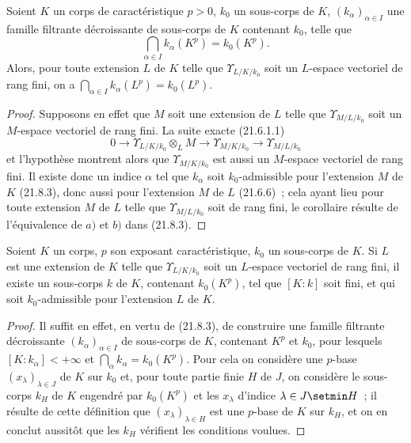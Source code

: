 \begin{corollary}[21.8.5]
\label{0.21.8.5-fr}
Soient $K$ un corps de caractéristique $p>0$, $k_0$ un sous-corps de $K$,
$(k_\alpha)_{\alpha\in I}$ une famille filtrante décroissante de sous-corps
de $K$ contenant $k_0$, telle que
\[
  \bigcap_{\alpha\in I}k_\alpha(K^p)=k_0(K^p).
\]
Alors, pour toute extension $L$ de $K$ telle que $\Upsilon_{L/K/k_0}$ soit
un $L$-espace vectoriel de rang fini, on a $\bigcap_{\alpha\in I}k_\alpha(L^p)=k_0(L^p)$.
\end{corollary}

\begin{proof}
Supposons en effet que $M$ soit une extension de $L$ telle que
$\Upsilon_{M/L/k_0}$ soit un $M$-espace vectoriel de rang fini. La suite
exacte (21.6.1.1)
\[
  0\longrightarrow \Upsilon_{L/K/k_0}\otimes_L M
  \longrightarrow \Upsilon_{M/K/k_0}
  \longrightarrow \Upsilon_{M/L/k_0}
\]
et l'hypothèse montrent alors que $\Upsilon_{M/K/k_0}$ est aussi un
$M$-espace vectoriel de rang fini. Il existe donc un indice $\alpha$ tel que
$k_\alpha$ soit $k_0$-admissible pour l'extension $M$ de $K$ (21.8.3), donc
aussi pour l'extension $M$ de $L$ (21.6.6)~; cela ayant lieu pour toute
extension $M$ de $L$ telle que $\Upsilon_{M/L/k_0}$ soit de rang fini, le
corollaire résulte de l'équivalence de $a)$ et $b)$ dans (21.8.3).
\end{proof}

\begin{corollary}[21.8.6]
\label{0.21.8.6-fr}
Soient $K$ un corps, $p$ son exposant caractéristique, $k_0$ un sous-corps de
$K$. Si $L$ est une extension de $K$ telle que $\Upsilon_{L/K/k_0}$ soit un
$L$-espace vectoriel de rang fini, il existe un sous-corps $k$ de $K$,
contenant $k_0(K^p)$, tel que $[K:k]$ soit fini, et qui soit
$k_0$-admissible pour l'extension $L$ de $K$.
\end{corollary}

\begin{proof}
Il suffit en effet, en vertu de (21.8.3), de construire une famille filtrante
décroissante $(k_\alpha)_{\alpha\in I}$ de sous-corps de $K$, contenant
$K^p$ et $k_0$, pour lesquels $[K:k_\alpha]<+\infty$ et
$\bigcap_\alpha k_\alpha=k_0(K^p)$. Pour cela on considère une $p$-base
$(x_\lambda)_{\lambda\in J}$ de $K$ sur $k_0$ et, pour toute partie finie
$H$ de $J$, on considère le sous-corps $k_H$ de $K$ engendré par $k_0(K^p)$
et les $x_\lambda$ d'indice $\lambda\in J\setmin H$~; il résulte de cette définition
que $(x_\lambda)_{\lambda\in H}$ est une $p$-base de $K$ sur $k_H$, et on en
conclut aussitôt que les $k_H$ vérifient les conditions voulues.
\end{proof}

